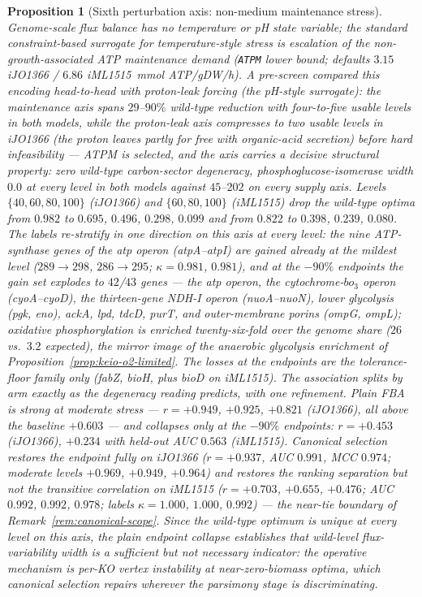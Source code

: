 \documentclass[11pt,a4paper]{article}
\theoremstyle{plain}
\newtheorem{proposition}[theorem]{Proposition}
\theoremstyle{definition}
\theoremstyle{remark}
\begin{document}
\begin{proposition}[Sixth perturbation axis: non-medium
maintenance stress]
\label{prop:keio-atpm}
Genome-scale flux balance has no temperature or pH state variable;
the standard constraint-based surrogate for temperature-style
stress is escalation of the non-growth-associated ATP maintenance
demand (\texttt{ATPM} lower bound; defaults $3.15$ iJO1366 /
$6.86$ iML1515~mmol ATP/gDW/h). A pre-screen compared this
encoding head-to-head with proton-leak forcing (the pH-style
surrogate): the maintenance axis spans $29$--$90\%$ wild-type
reduction with four-to-five usable levels in both models, while
the proton-leak axis compresses to two usable levels in iJO1366
(the proton leaves partly for free with organic-acid secretion)
before hard infeasibility --- ATPM is selected, and the axis
carries a decisive structural property: \emph{zero} wild-type
carbon-sector degeneracy, phosphoglucose-isomerase width $0.0$ at
every level in both models against $45$--$202$ on every supply
axis. Levels $\{40,60,80,100\}$ (iJO1366) and $\{60,80,100\}$
(iML1515) drop the wild-type optima from $0.982$ to $0.695$,
$0.496$, $0.298$, $0.099$ and from $0.822$ to $0.398$, $0.239$,
$0.080$. The labels re-stratify in one direction on this axis at
every level: the nine ATP-synthase genes of the \emph{atp} operon
(\emph{atpA}--\emph{atpI}) are gained already at the mildest level
($289\to298$, $286\to295$; $\kappa=0.981$, $0.981$), and at the
$-90\%$ endpoints the gain set explodes to $42$/$43$ genes ---
the \emph{atp} operon, the cytochrome-$bo_3$ operon
(\emph{cyoA}--\emph{cyoD}), the thirteen-gene NDH-I operon
(\emph{nuoA}--\emph{nuoN}), lower glycolysis (\emph{pgk},
\emph{eno}), \emph{ackA}, \emph{lpd}, \emph{tdcD}, \emph{purT},
and outer-membrane porins (\emph{ompG}, \emph{ompL}); oxidative
phosphorylation is enriched twenty-six-fold over the genome share
($26$ vs.\ $3.2$ expected), the mirror image of the anaerobic
glycolysis enrichment of
Proposition~\ref{prop:keio-o2-limited}. The losses at the
endpoints are the tolerance-floor family only (\emph{fabZ},
\emph{bioH}, plus \emph{bioD} on iML1515). The association splits
by arm exactly as the degeneracy reading predicts, with one
refinement. Plain FBA is \emph{strong at moderate stress} ---
$r=+0.949$, $+0.925$, $+0.821$ (iJO1366), all above the baseline
$+0.603$ --- and collapses only at the $-90\%$ endpoints:
$r=+0.453$ (iJO1366), $+0.234$ with held-out AUC $0.563$
(iML1515). Canonical selection restores the endpoint fully on
iJO1366 ($r=+0.937$, AUC $0.991$, MCC $0.974$; moderate levels
$+0.969$, $+0.949$, $+0.964$) and restores the ranking separation
but not the transitive correlation on iML1515 ($r=+0.703$,
$+0.655$, $+0.476$; AUC $0.992$, $0.992$, $0.978$; labels
$\kappa=1.000$, $1.000$, $0.992$) --- the near-tie boundary of
Remark~\ref{rem:canonical-scope}. Since the wild-type optimum is
unique at every level on this axis, the plain endpoint collapse
establishes that wild-level flux-variability width is a sufficient
but not necessary indicator: the operative mechanism is per-KO
vertex instability at near-zero-biomass optima, which canonical
selection repairs wherever the parsimony stage is discriminating.
\end{proposition}
\end{document}
